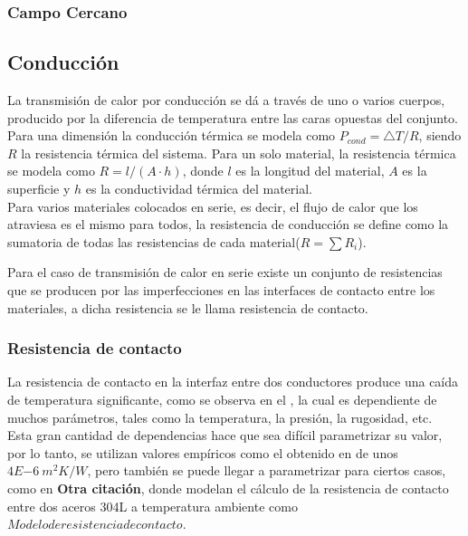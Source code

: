 \subsubsection{Campo Cercano}
\subsection{Conducción}
La transmisión de calor por conducción se dá a través de uno o varios cuerpos, producido por la diferencia de temperatura entre las caras opuestas del conjunto. Para una dimensión la conducción térmica se modela como $P_{cond}={\bigtriangleup T}/{R} $, siendo $R$ la resistencia térmica del sistema.
Para un solo material, la resistencia térmica se modela como $R = l/{\left(A\cdot h\right)}$, donde $l$ es la longitud del material, $A$ es la superficie y $h$ es la conductividad térmica del material.\\

Para varios materiales colocados en serie, es decir, el flujo de calor que los atraviesa es el mismo para todos, la resistencia de conducción se define como la sumatoria de todas las resistencias de cada material($R=\sum R_i$).

Para el caso de transmisión de calor en serie existe un conjunto de resistencias que se producen por las imperfecciones en las interfaces de contacto entre los materiales, a dicha resistencia se le llama resistencia de contacto.


\subsubsection{Resistencia de contacto}
La resistencia de contacto en la interfaz entre dos conductores produce una caída de temperatura significante, como se observa en el \cite{noauthor_parallel-plate_nodate}, la cual es dependiente de muchos parámetros, tales como la temperatura, la presión, la rugosidad, etc.\\

Esta gran cantidad de dependencias hace que sea difícil parametrizar su valor, por lo tanto, se utilizan valores empíricos como el obtenido en \cite{noauthor_parallel-plate_nodate} de unos $4E{-6} \ m^2K/W$, pero también se puede llegar a parametrizar para ciertos casos, como en \textbf{Otra citación}, donde modelan el cálculo de la resistencia de contacto entre dos aceros 304L a temperatura ambiente como $Modelo de resistencia de contacto$.